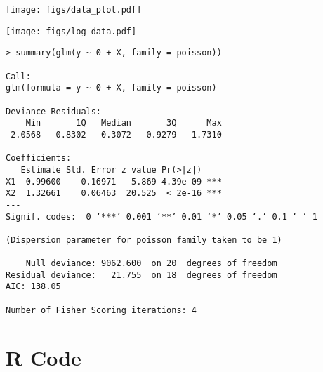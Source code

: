 \documentclass[12pt]{article}
\begin{document}
\begin{center}

\texttt{[image: figs/data\_plot.pdf]}

\vfill

\texttt{[image: figs/log\_data.pdf]}

\end{center}


\begin{verbatim}
> summary(glm(y ~ 0 + X, family = poisson))

Call:
glm(formula = y ~ 0 + X, family = poisson)

Deviance Residuals: 
    Min       1Q   Median       3Q      Max  
-2.0568  -0.8302  -0.3072   0.9279   1.7310  

Coefficients:
   Estimate Std. Error z value Pr(>|z|)    
X1  0.99600    0.16971   5.869 4.39e-09 ***
X2  1.32661    0.06463  20.525  < 2e-16 ***
---
Signif. codes:  0 ‘***’ 0.001 ‘**’ 0.01 ‘*’ 0.05 ‘.’ 0.1 ‘ ’ 1

(Dispersion parameter for poisson family taken to be 1)

    Null deviance: 9062.600  on 20  degrees of freedom
Residual deviance:   21.755  on 18  degrees of freedom
AIC: 138.05

Number of Fisher Scoring iterations: 4
\end{verbatim}


\newpage
\section*{R Code}
\begin{tiny}
\lstset{stepnumber=1, numbers=left}

\end{tiny}
\end{document}
